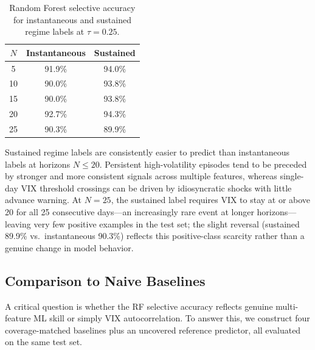 \documentclass[12pt]{article}
\begin{document}
\begin{table}[H]
\centering
\caption{Random Forest selective accuracy for instantaneous and sustained regime labels at $\tau = 0.25$.}
\label{tab:sustained}
\begin{tabular}{ccc}
\toprule
$N$ & Instantaneous & Sustained \\
\midrule
5  & 91.9\% & 94.0\% \\
10 & 90.0\% & 93.8\% \\
15 & 90.0\% & 93.8\% \\
20 & 92.7\% & 94.3\% \\
25 & 90.3\% & 89.9\% \\
\bottomrule
\end{tabular}
\end{table}

Sustained regime labels are consistently easier to predict than instantaneous labels at horizons $N \leq 20$. Persistent high-volatility episodes tend to be preceded by stronger and more consistent signals across multiple features, whereas single-day VIX threshold crossings can be driven by idiosyncratic shocks with little advance warning. At $N = 25$, the sustained label requires VIX to stay at or above 20 for all 25 consecutive days---an increasingly rare event at longer horizons---leaving very few positive examples in the test set; the slight reversal (sustained 89.9\% vs.\ instantaneous 90.3\%) reflects this positive-class scarcity rather than a genuine change in model behavior.

\subsection{Comparison to Naive Baselines}
\label{sec:baselines}

A critical question is whether the RF selective accuracy reflects genuine multi-feature ML skill or simply VIX autocorrelation. To answer this, we construct four coverage-matched baselines plus an uncovered reference predictor, all evaluated on the same test set.
\end{document}
